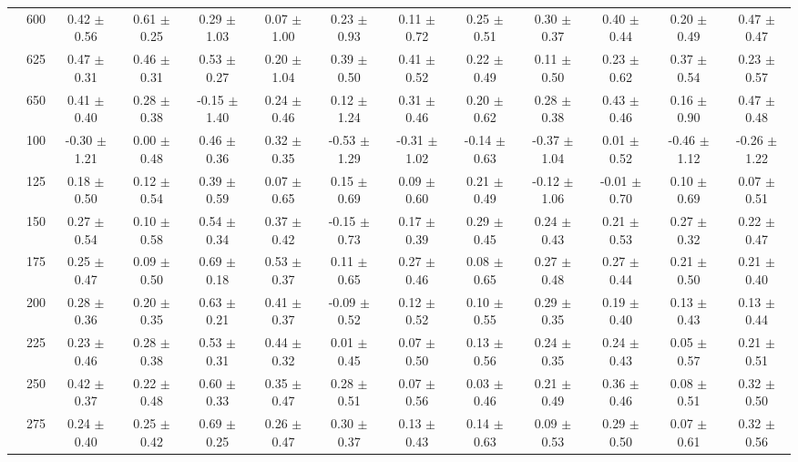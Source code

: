 \begin{table}[h]
{\begin{tabular}{
        ccccccccccccc}
 & 600& 0.42 $\pm$ 0.56& 0.61 $\pm$ 0.25& 0.29 $\pm$ 1.03& 0.07 $\pm$ 1.00& 0.23 $\pm$ 0.93& 0.11 $\pm$ 0.72& 0.25 $\pm$ 0.51& 0.30 $\pm$ 0.37& 0.40 $\pm$ 0.44& 0.20 $\pm$ 0.49& 0.47 $\pm$ 0.47 \\ 
 & 625& 0.47 $\pm$ 0.31& 0.46 $\pm$ 0.31& 0.53 $\pm$ 0.27& 0.20 $\pm$ 1.04& 0.39 $\pm$ 0.50& 0.41 $\pm$ 0.52& 0.22 $\pm$ 0.49& 0.11 $\pm$ 0.50& 0.23 $\pm$ 0.62& 0.37 $\pm$ 0.54& 0.23 $\pm$ 0.57 \\ 
 & 650& 0.41 $\pm$ 0.40& 0.28 $\pm$ 0.38& -0.15 $\pm$ 1.40& 0.24 $\pm$ 0.46& 0.12 $\pm$ 1.24& 0.31 $\pm$ 0.46& 0.20 $\pm$ 0.62& 0.28 $\pm$ 0.38& 0.43 $\pm$ 0.46& 0.16 $\pm$ 0.90& 0.47 $\pm$ 0.48 \\ \hline 
 & 100& -0.30 $\pm$ 1.21& 0.00 $\pm$ 0.48& 0.46 $\pm$ 0.36& 0.32 $\pm$ 0.35& -0.53 $\pm$ 1.29& -0.31 $\pm$ 1.02& -0.14 $\pm$ 0.63& -0.37 $\pm$ 1.04& 0.01 $\pm$ 0.52& -0.46 $\pm$ 1.12& -0.26 $\pm$ 1.22 \\ 
 & 125& 0.18 $\pm$ 0.50& 0.12 $\pm$ 0.54& 0.39 $\pm$ 0.59& 0.07 $\pm$ 0.65& 0.15 $\pm$ 0.69& 0.09 $\pm$ 0.60& 0.21 $\pm$ 0.49& -0.12 $\pm$ 1.06& -0.01 $\pm$ 0.70& 0.10 $\pm$ 0.69& 0.07 $\pm$ 0.51 \\ 
 & 150& 0.27 $\pm$ 0.54& 0.10 $\pm$ 0.58& 0.54 $\pm$ 0.34& 0.37 $\pm$ 0.42& -0.15 $\pm$ 0.73& 0.17 $\pm$ 0.39& 0.29 $\pm$ 0.45& 0.24 $\pm$ 0.43& 0.21 $\pm$ 0.53& 0.27 $\pm$ 0.32& 0.22 $\pm$ 0.47 \\ 
 & 175& 0.25 $\pm$ 0.47& 0.09 $\pm$ 0.50& 0.69 $\pm$ 0.18& 0.53 $\pm$ 0.37& 0.11 $\pm$ 0.65& 0.27 $\pm$ 0.46& 0.08 $\pm$ 0.65& 0.27 $\pm$ 0.48& 0.27 $\pm$ 0.44& 0.21 $\pm$ 0.50& 0.21 $\pm$ 0.40 \\ 
 & 200& 0.28 $\pm$ 0.36& 0.20 $\pm$ 0.35& 0.63 $\pm$ 0.21& 0.41 $\pm$ 0.37& -0.09 $\pm$ 0.52& 0.12 $\pm$ 0.52& 0.10 $\pm$ 0.55& 0.29 $\pm$ 0.35& 0.19 $\pm$ 0.40& 0.13 $\pm$ 0.43& 0.13 $\pm$ 0.44 \\ 
 & 225& 0.23 $\pm$ 0.46& 0.28 $\pm$ 0.38& 0.53 $\pm$ 0.31& 0.44 $\pm$ 0.32& 0.01 $\pm$ 0.45& 0.07 $\pm$ 0.50& 0.13 $\pm$ 0.56& 0.24 $\pm$ 0.35& 0.24 $\pm$ 0.43& 0.05 $\pm$ 0.57& 0.21 $\pm$ 0.51 \\ 
 & 250& 0.42 $\pm$ 0.37& 0.22 $\pm$ 0.48& 0.60 $\pm$ 0.33& 0.35 $\pm$ 0.47& 0.28 $\pm$ 0.51& 0.07 $\pm$ 0.56& 0.03 $\pm$ 0.46& 0.21 $\pm$ 0.49& 0.36 $\pm$ 0.46& 0.08 $\pm$ 0.51& 0.32 $\pm$ 0.50 \\ 
 & 275& 0.24 $\pm$ 0.40& 0.25 $\pm$ 0.42& 0.69 $\pm$ 0.25& 0.26 $\pm$ 0.47& 0.30 $\pm$ 0.37& 0.13 $\pm$ 0.43& 0.14 $\pm$ 0.63& 0.09 $\pm$ 0.53& 0.29 $\pm$ 0.50& 0.07 $\pm$ 0.61& 0.32 $\pm$ 0.56 \\ 

\end{tabular}}
\end{table}
